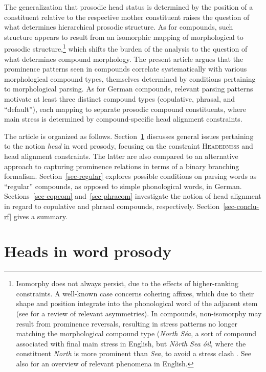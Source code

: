 \documentclass[output=paper
 ,nobabel
 ,draftmode
 ,colorlinks, citecolor=brown
]{langscibook}
\begin{document}
\largerpage
The generalization that prosodic head status is determined by the position of a constituent relative
to the respective mother constituent raises the question of what determines hierarchical prosodic
structure. As for compounds, such structure appears to result from an isomorphic mapping of
morphological to prosodic structure,\footnote{\label{fn-isomorphy}Isomorphy does not always persist,
  due to the effects of higher-ranking constraints. A well-known case concerns cohering affixes,
  which due to their shape and position integrate into the phonological word of the adjacent stem
  (see \citet{Raffelsiefen2022} for a review of relevant asymmetries). In compounds, non-isomorphy
  may result from prominence reversals, resulting in stress patterns no longer matching the
  morphological compound type (\eg \emph{North Séa}, a sort of compound associated with final main
  stress in English, but \emph{Nòrth Sea óil}, where the constituent \emph{North} is more prominent than
  \emph{Sea}, to avoid a stress clash \citep[137]{Fudge1984}. See also \citet{Gussenhoven2011} for
  an overview of relevant phenomena in English.} which shifts the burden of the analysis to the
question of what determines compound morphology. The present article argues that the prominence patterns seen in compounds
correlate systematically with various morphological compound types, themselves
determined by conditions pertaining to morphological parsing. As for German compounds, relevant
parsing patterns motivate at least three distinct compound types (copulative, phrasal, and
``default''), each mapping to separate prosodic compound constituents, where main stress is
determined by compound-specific head alignment constraints.    

The article is organized as follows. Section~\ref{sec-wordprosody} discusses general issues pertaining to the notion \emph{head} in word prosody, focusing on the constraint \textsc{Headedness} and head alignment constraints. The latter are also compared to an alternative approach to capturing prominence relations in terms of a binary branching formalism.  Section~\ref{sec-regular} explores possible conditions on parsing words as ``regular'' compounds, as opposed to simple phonological words, in German. Sections~\ref{sec-copcom} and~\ref{sec-phracom} investigate the notion of head alignment in regard to copulative and phrasal compounds, respectively. Section~\ref{sec-conclu-rf} gives a summary. 

\section{Heads in word prosody}
\label{sec-wordprosody}
\end{document}
